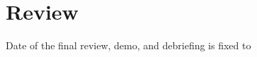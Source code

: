 
\section*{Review}

Date of the final review, demo, and debriefing is fixed to

\begin{center}
\end{center}



